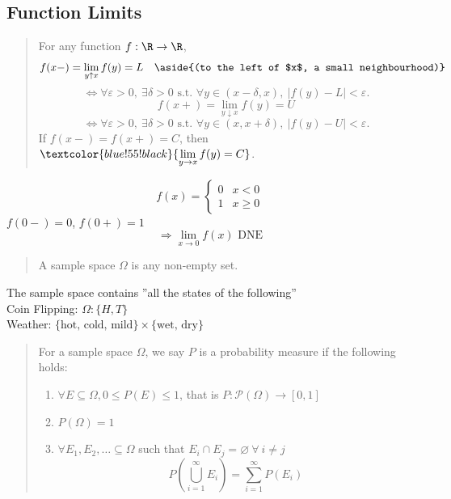 \subsection{Function Limits}

\begin{quote}
    For any function $f: \R \to \R$,
    \[f(x-) = \lim_{y\uparrow x} f(y) = L \quad \aside{(to the left of $x$, a small neighbourhood)}\]
    \[\Leftrightarrow \forall \varepsilon>0,\ \exists \delta>0 \text{ s.t. } \forall y \in (x-\delta,x),\ \left\lvert f(y)-L\right\rvert < \varepsilon.\]
    \[f(x+) = \lim_{y\downarrow x} f(y) = U\]
    \[\Leftrightarrow \forall \varepsilon>0,\ \exists \delta>0 \text{ s.t. } \forall y \in (x,x+\delta),\ \left\lvert f(y)-U\right\rvert < \varepsilon.\]
    If $f(x-) = f(x+) = C$, then $\textcolor{blue!55!black}{\displaystyle\lim_{y\to x} f(y) = C}$.
\end{quote}

\begin{example}
    \[f(x) = \begin{cases} 0 & x<0 \\ 1 & x\geq 0 \end{cases}\]
    $f(0-) = 0$, $f(0+) = 1$
    \[\Rightarrow \lim_{x\to 0} f(x) \text{ DNE}\]
\end{example}



\begin{quote}
    A sample space $\Omega$ is any non-empty set.
\end{quote}

\begin{example}
    The sample space contains ''all the states of the following''
    \\Coin Flipping: $\Omega: \{H, T\}$
    \\Weather: $\{\text{hot, cold, mild}\} \times \{\text{wet, dry}\}$
\end{example}

\begin{quote}
    For a sample space $\Omega$, we say $P$ is a probability measure if the following holds:
    \begin{enumerate}[label=\roman*)]
        \item $\forall E \subseteq \Omega, 0 \leq P(E) \leq 1$, that is $P:\mathcal{P}(\Omega) \to [0,1]$
        \item $P(\Omega) = 1$
        \item $\forall E_1, E_2, \dots \subseteq \Omega$ such that $E_i \cap E_j = \varnothing \ \forall\ i \neq j$
        \[P\left(\bigcup_{i=1}^{\infty} E_i\right) = \sum_{i=1}^{\infty}P(E_i)\]
    \end{enumerate}
\end{quote}

